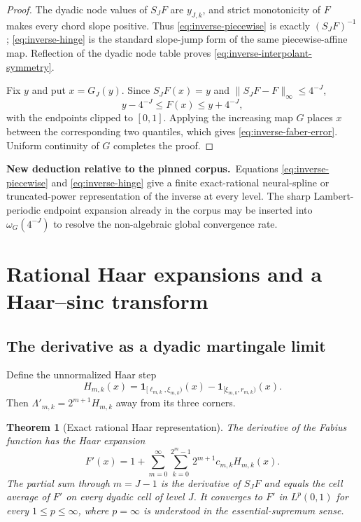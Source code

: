 \documentclass[11pt,oneside]{article}
\newtheorem{theorem}{Theorem}[section]
\theoremstyle{definition}
\theoremstyle{remark}
\newcommand{\1}{\mathbf 1}
\newcommand{\newresult}{\textcolor{newgreen}{\textbf{New deduction relative to the pinned corpus.}}\ }
\begin{document}
\begin{proof}
The dyadic node values of $S_JF$ are $y_{J,k}$, and strict monotonicity of
$F$ makes every chord slope positive.  Thus \eqref{eq:inverse-piecewise} is
exactly $(S_JF)^{-1}$; \eqref{eq:inverse-hinge} is the standard
slope-jump form of the same piecewise-affine map.  Reflection of the dyadic
node table proves \eqref{eq:inverse-interpolant-symmetry}.

Fix $y$ and put $x=G_J(y)$.  Since $S_JF(x)=y$ and
$\|S_JF-F\|_\infty\le4^{-J}$,
\[
 y-4^{-J}\le F(x)\le y+4^{-J},
\]
with the endpoints clipped to $[0,1]$.  Applying the increasing map $G$
places $x$ between the corresponding two quantiles, which gives
\eqref{eq:inverse-faber-error}.  Uniform continuity of $G$ completes the
proof.
\end{proof}

\newresult Equations \eqref{eq:inverse-piecewise} and
\eqref{eq:inverse-hinge} give a finite exact-rational neural-spline or
truncated-power representation of the inverse at every level.  The sharp
Lambert-periodic endpoint expansion already in the corpus may be inserted
into $\omega_G(4^{-J})$ to resolve the non-algebraic global convergence rate.

\section{Rational Haar expansions and a Haar--sinc transform}
\label{sec:haar}

\subsection{The derivative as a dyadic martingale limit}

Define the unnormalized Haar step
\begin{equation}
 H_{m,k}(x)=
 \1_{[\ell_{m,k},\xi_{m,k})}(x)
 -\1_{[\xi_{m,k},r_{m,k})}(x).                           \label{eq:haar-step}
\end{equation}
Then $\Lambda'_{m,k}=2^{m+1}H_{m,k}$ away from its three
corners.

\begin{theorem}[Exact rational Haar representation]
\label{thm:haar-Fprime}
The derivative of the Fabius function has the Haar expansion
\begin{equation}
 \boxed{\displaystyle
 F'(x)=1+\sum_{m=0}^\infty\sum_{k=0}^{2^m-1}
 2^{m+1}c_{m,k}H_{m,k}(x).}                              \label{eq:haar-Fprime}
\end{equation}
The partial sum through $m=J-1$ is the derivative of $S_JF$ and equals the
cell average of $F'$ on every dyadic cell of level $J$.  It converges to
$F'$ in $L^p(0,1)$ for every $1\le p\le\infty$, where $p=\infty$ is
understood in the essential-supremum sense.
\end{theorem}
\end{document}
